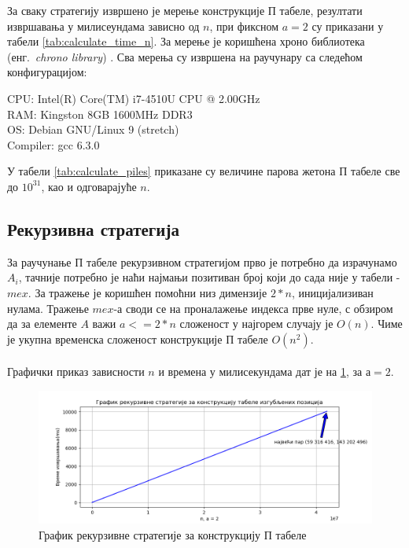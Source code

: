 \documentclass[a4paper]{article}
\begin{document}
За сваку стратегију извршено је мерење конструкције П табеле, резултати извршавања у милисеундама зависно од $ n $, при фиксном $ a = 2 $ су приказани у табели \ref{tab:calculate_time_n}. 
За мерење је коришћена хроно библиотека (енг.{~\em chrono library}) \cite{chrono_library}. Сва мерења су извршена на раучунару са следећом конфигурацијом:
\begin{flushleft}
	CPU: Intel(R) Core(TM) i7-4510U CPU @ 2.00GHz\\
	RAM: Kingston 8GB 1600MHz DDR3\\
	OS: Debian GNU/Linux 9 (stretch)\\
	Compiler: gcc 6.3.0\\
\end{flushleft}

У табели \ref{tab:calculate_piles} приказане су величине парова жетона П табеле све до $ 10^{31} $, као и одговарајуће $ n $.

\subsection{Рекурзивна стратегија}

За раучунање П табеле рекурзивном стратегијом прво је потребно да израчунамо $ A_{i} $, тачније потребно је наћи најмањи позитиван број који до сада није у табели - $ mex $. За тражење је коришћен помоћни низ димензије $ 2*n $, иницијализиван нулама. Тражење $ mex $-а  своди се на проналажење индекса прве нуле, с обзиром да за елементе $ A $ важи $ a <= 2*n $ сложеност у најгорем случају је $ O(n) $. Чиме је укупна временска сложеност конструкције П табеле $ O(n^2) $.\\



\leavevmode\\
Графички приказ зависности $ n $ и времена у милисекундама дат је на \ref{fig:recursive}, за $ а = 2 $.

\begin{figure}[H]
	\caption{График рекурзивне стратегије за конструкцију П табеле}
	\label{fig:recursive}
	\begin{center}
		\includegraphics[width=\textwidth]{recursive.png}
	\end{center}
\end{figure}
\end{document}
